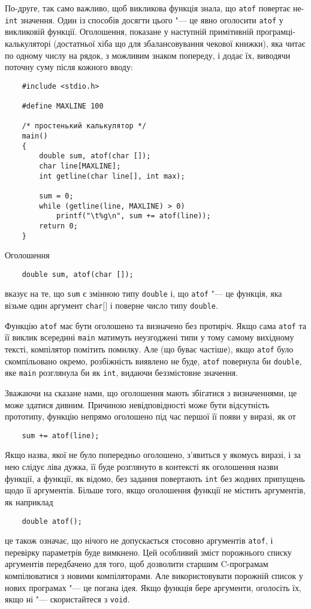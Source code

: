 \documentclass[a4paper,12pt]{book}
\begin{document}
  По-друге, так само важливо, щоб викликова функція знала, що \texttt{atof} повертає
  не-\texttt{int} значення. Один із способів досягти цього "--- це явно оголосити
  \texttt{atof} у викликовій функції. Оголошення, показане у наступній примітивній
  програмці-калькуляторі (достатньої хіба що для збалансовування чекової книжки), яка
  читає по одному числу на рядок, з можливим знаком попереду, і додає їх, виводячи поточну
  суму після кожного вводу:
  \begin{verbatim}
    #include <stdio.h>

    #define MAXLINE 100

    /* простенький калькулятор */
    main()
    {
        double sum, atof(char []);
        char line[MAXLINE];
        int getline(char line[], int max);

        sum = 0;
        while (getline(line, MAXLINE) > 0)
            printf("\t%g\n", sum += atof(line));
        return 0;
    }
  \end{verbatim}

  Оголошення
  \begin{verbatim}
    double sum, atof(char []);
  \end{verbatim}
  вказує на те, що \texttt{sum} є змінною типу \texttt{double} і, що \texttt{atof}
  "--- це функція, яка візьме один аргумент \texttt{char\mbox{$[$}\mbox{$]$}} і поверне число типу
  \texttt{double}.

  Функцію \texttt{atof} має бути оголошено та визначено без протиріч. Якщо сама
  \texttt{atof} та її виклик всередині \texttt{main} матимуть неузгоджені типи у тому
  самому вихідному тексті, компілятор помітить помилку. Але (що буває частіше), якщо
  \texttt{atof} було скомпільовано окремо, розбіжність виявлено не буде, \texttt{atof}
  повернула би \texttt{double}, яке \texttt{main} розглянула би як \texttt{int}, видаючи
  беззмістовне значення.

  Зважаючи на сказане нами, що оголошення мають збігатися з визначеннями, це може
  здатися дивним. Причиною невідповідності може бути відсутність прототипу, функцію
  непрямо оголошено під час першої її появи у виразі, як от
  \begin{verbatim}
    sum += atof(line);
  \end{verbatim}

  Якщо назва, якої не було попередньо оголошено, з'явиться у якомусь виразі, і за нею
  слідує ліва дужка, її буде розглянуто в контексті як оголошення назви функції, а
  функції, як відомо, без задання повертають \texttt{int} без жодних припущень щодо її
  аргументів. Більше того, якщо оголошення функції не містить аргументів, як наприклад
  \begin{verbatim}
    double atof();
  \end{verbatim}
  це також означає, що нічого не допускається стосовно аргументів \texttt{atof}, і
  перевірку параметрів буде вимкнено. Цей особливий зміст порожнього списку аргументів
  передбачено для того, щоб дозволити старшим C-програмам компілюватися з новими
  компіляторами. Але використовувати порожній список у нових програмах "--- це погана
  ідея. Якщо функція бере аргументи, оголосіть їх, якщо ні "--- скористайтеся з
  \texttt{void}.
\end{document}
